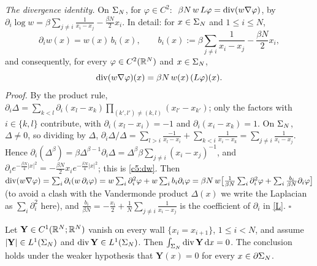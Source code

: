 \smallskip\noindent\emph{The divergence identity.} On $\Sigma_N$, for $\varphi\in C^2$: $\ \beta N\,w\,L\varphi=\operatorname{div}(w\nabla\varphi)$, by $\partial_i\log w=\beta\sum_{j\ne i}\frac1{x_i-x_j}-\frac{\beta N}2x_i$. In detail: for $x\in\Sigma_N$ and $1\le i\le N$,
\begin{equation}\label{c5:dw}
\partial_iw(x)=w(x)\,b_i(x),\qquad b_i(x):=\beta\sum_{j\ne i}\frac1{x_i-x_j}-\frac{\beta N}{2}x_i ,
\end{equation}
and consequently, for every $\varphi\in C^2(\mathbb{R}^N)$ and $x\in\Sigma_N$,
\begin{equation}\label{c5:div}
\operatorname{div}(w\nabla\varphi)(x)=\beta N\,w(x)\,(L\varphi)(x).
\end{equation}
\emph{Proof.} By the product rule, $\partial_i\Delta=\sum_{k<l}\partial_i(x_l-x_k)\prod_{(k',l')\ne(k,l)}(x_{l'}-x_{k'})$; only the factors with $i\in\{k,l\}$ contribute, with $\partial_i(x_l-x_i)=-1$ and $\partial_i(x_i-x_k)=1$. On $\Sigma_N$, $\Delta\ne0$, so dividing by $\Delta$,
$\partial_i\Delta/\Delta=\sum_{l>i}\frac{-1}{x_l-x_i}+\sum_{k<i}\frac1{x_i-x_k}=\sum_{j\ne i}\frac1{x_i-x_j}$.
Hence $\partial_i(\Delta^\beta)=\beta\Delta^{\beta-1}\partial_i\Delta=\Delta^\beta\beta\sum_{j\ne i}(x_i-x_j)^{-1}$, and $\partial_ie^{-\frac{\beta N}4|x|^2}=-\frac{\beta N}2x_ie^{-\frac{\beta N}4|x|^2}$; this is \eqref{c5:dw}. Then
$\operatorname{div}(w\nabla\varphi)=\sum_i\partial_i(w\,\partial_i\varphi)=w\sum_i\partial_i^2\varphi+w\sum_ib_i\partial_i\varphi=\beta N\,w\big[\frac1{\beta N}\sum_i\partial_i^2\varphi+\sum_i\frac{b_i}{\beta N}\partial_i\varphi\big]$ (to avoid a clash with the Vandermonde product $\Delta(x)$ we write the Laplacian as $\sum_i\partial_i^2$ here), and $\frac{b_i}{\beta N}=-\frac{x_i}2+\frac1N\sum_{j\ne i}\frac1{x_i-x_j}$ is the coefficient of $\partial_i$ in \eqref{L}. \hfill$\square$

\begin{lemma}\label{lem:div}
Let $\mathbf Y\in C^1(\mathbb{R}^N;\mathbb{R}^N)$ vanish on every wall $\{x_i=x_{i+1}\}$, $1\le i<N$, and assume $|\mathbf Y|\in L^1(\Sigma_N)$ and $\operatorname{div}\mathbf Y\in L^1(\Sigma_N)$. Then $\int_{\Sigma_N}\operatorname{div}\mathbf Y\,\mathrm{d} x=0$.
The conclusion holds under the weaker hypothesis that $\mathbf Y(x)=0$ for every $x\in\partial\Sigma_N$.
\end{lemma}

